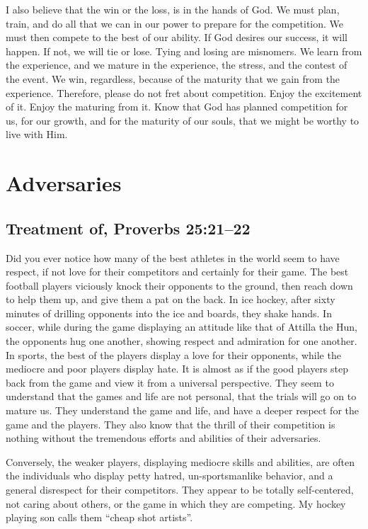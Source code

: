 \documentclass[12pt]{memoir}
\begin{document}
I also believe that the win or the loss, is in the hands of God. We
must plan, train, and do all that we can in our power to prepare for
the competition. We must then compete to the best of our ability.
If God desires our success, it will happen. If not, we will tie or
lose. Tying and losing are misnomers. We learn from the experience,
and we mature in the experience, the stress, and the contest of the
event. We win, regardless, because of the maturity that we gain from
the experience. Therefore, please do not fret about competition. Enjoy
the excitement of it. Enjoy the maturing from it. Know that God has
planned competition for us, for our growth, and for the maturity of
our souls, that we might be worthy to live with Him.

\section{Adversaries}

\subsection{Treatment of, Proverbs 25:21--22}\label{adversaries-treatment-of-proverbs-2521-22}

Did you ever notice how many of the best athletes in the world seem
to have respect, if not love for their competitors and certainly for
their game. The best football players viciously knock their opponents
to the ground, then reach down to help them up, and give them a pat
on the back. In ice hockey, after sixty minutes of drilling opponents
into the ice and boards, they shake hands. In soccer, while during
the game displaying an attitude like that of Attilla the Hun, the
opponents hug one another, showing respect and admiration for one
another. In sports, the best of the players display a love for their
opponents, while the mediocre and poor players display hate. It is
almost as if the good players step back from the game and view it
from a universal perspective. They seem to understand that the games
and life are not personal, that the trials will go on to mature us.
They understand the game and life, and have a deeper respect for the
game and the players. They also know that the thrill of their competition
is nothing without the tremendous efforts and abilities of their adversaries.

Conversely, the weaker players, displaying mediocre skills and abilities,
are often the individuals who display petty hatred, un-sportsmanlike
behavior, and a general disrespect for their competitors. They appear
to be totally self-centered, not caring about others, or the game
in which they are competing. My hockey playing son calls them ``cheap
shot artists''.
\end{document}
